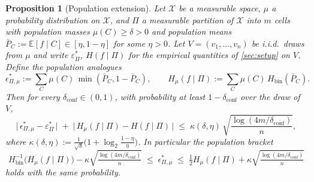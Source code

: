 \documentclass[10pt]{article}
\newtheorem{proposition}[theorem]{Proposition}
\theoremstyle{definition}
\theoremstyle{remark}
\newcommand{\Hbin}{H_{\mathrm{bin}}}
\newcommand{\Hinv}{H_{\mathrm{bin}}^{-1}}
\newcommand{\eps}{\varepsilon}
\newcommand{\epsP}{\eps^{\!*}_{\Pi}}
\newcommand{\E}{\mathbb{E}}
\begin{document}
\begin{proposition}[Population extension]\label{prop:pop}
Let $\mathcal{X}$ be a measurable space, $\mu$ a probability
distribution on $\mathcal{X}$, and $\Pi$ a measurable partition
of $\mathcal{X}$ into $m$ cells with population masses
$\mu(C) \ge \delta > 0$ and population means
$\bar P_{C} := \E[f \mid C] \in [\eta, 1 - \eta]$ for some
$\eta > 0$. Let $V = (v_{1}, \ldots, v_{n})$ be i.i.d.\ draws
from $\mu$ and write $\epsP$, $H(f \mid \Pi)$ for the empirical
quantities of \cref{sec:setup} on $V$. Define the population
analogues
\[
  \epsilon^{*}_{\Pi,\mu}
    := \sum_{C} \mu(C)\,\min(\bar P_{C}, 1 - \bar P_{C}),
  \qquad
  H_{\mu}(f \mid \Pi)
    := \sum_{C} \mu(C)\,\Hbin(\bar P_{C}).
\]
Then for every $\delta_{\mathrm{conf}} \in (0, 1)$, with
probability at least $1 - \delta_{\mathrm{conf}}$ over the draw
of $V$,
\begin{equation}\label{eq:pop-concentration}
  \bigl|\,\epsilon^{*}_{\Pi,\mu} - \epsP\,\bigr|
    \;+\; \bigl|\,H_{\mu}(f \mid \Pi) - H(f \mid \Pi)\,\bigr|
  \;\le\; \kappa(\delta, \eta)
    \,\sqrt{\frac{\log(4 m / \delta_{\mathrm{conf}})}{n}},
\end{equation}
where $\kappa(\delta, \eta) := \tfrac{1}{\sqrt{\delta}}
  \bigl(1 + \log_{2}\!\tfrac{1-\eta}{\eta}\bigr)$.
In particular the population bracket
\begin{equation}\label{eq:pop-bracket}
  \Hinv\!\bigl(H_{\mu}(f \mid \Pi)\bigr)
    - \kappa\sqrt{\tfrac{\log(4m/\delta_{\mathrm{conf}})}{n}}
  \;\le\; \epsilon^{*}_{\Pi,\mu}
  \;\le\; \tfrac{1}{2} H_{\mu}(f \mid \Pi)
    + \kappa\sqrt{\tfrac{\log(4m/\delta_{\mathrm{conf}})}{n}}
\end{equation}
holds with the same probability.
\end{proposition}
\end{document}
